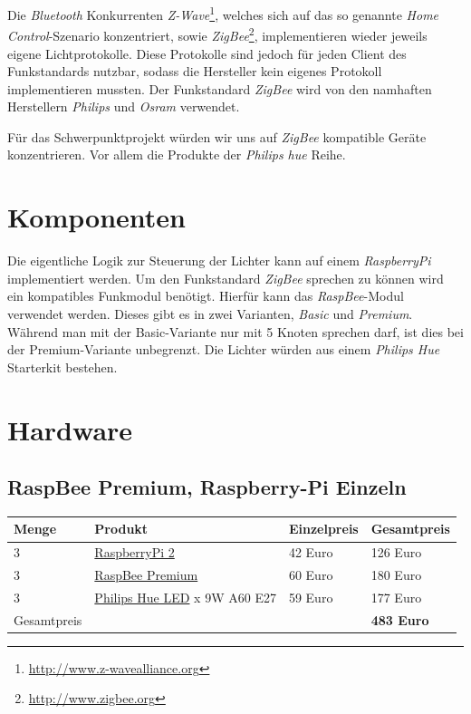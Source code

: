 \documentclass[a4paper,12pt]{article}
\begin{document}
Die \textit{Bluetooth} Konkurrenten
\textit{Z-Wave}\footnote{\url{http://www.z-wavealliance.org}}, welches sich auf das
so genannte \textit{Home Control}-Szenario konzentriert, sowie
\textit{ZigBee}\footnote{\url{http://www.zigbee.org}},
implementieren wieder jeweils eigene Lichtprotokolle. Diese Protokolle sind jedoch
für jeden Client des Funkstandards nutzbar, sodass die Hersteller kein
eigenes Protokoll implementieren mussten. Der Funkstandard \textit{ZigBee} wird
von den namhaften Herstellern \textit{Philips} und \textit{Osram} verwendet.

Für das Schwerpunktprojekt würden wir uns auf \textit{ZigBee} kompatible Geräte
konzentrieren. Vor allem die Produkte der \textit{Philips hue} Reihe.

\section{Komponenten}
\label{components}

Die eigentliche Logik zur Steuerung der Lichter kann auf einem \textit{RaspberryPi}
implementiert werden. Um den Funkstandard \textit{ZigBee} sprechen zu können wird ein
kompatibles Funkmodul benötigt. Hierfür kann das \textit{RaspBee}-Modul verwendet werden.
Dieses gibt es in zwei Varianten, \textit{Basic} und \textit{Premium}. Während man mit der
Basic-Variante nur mit 5 Knoten sprechen darf, ist dies bei der Premium-Variante
unbegrenzt. Die Lichter würden aus einem \textit{Philips Hue} Starterkit bestehen.

\section{Hardware}
\label{hardware}

\subsection{RaspBee Premium, Raspberry-Pi Einzeln}

\begin{tabular}{p{2cm}p{4.5cm}p{3cm}p{3cm}}
   Menge & Produkt & Einzelpreis & Gesamtpreis\\
   \hline
   3 & \href{http://www.conrad.de/ce/de/product/1316978/Raspberry-Pi-2-Model-B-1-GB-ohne-Betriebssystem}{RaspberryPi 2} & 42 Euro & 126 Euro\\
   3 & \href{http://www.conrad.de/ce/de/product/1369407/Raspberry-Pi-Erweiterungs-Platine-Zigbee-200-Knotenpunkte-Raspberry-Pi}{RaspBee Premium} & 60 Euro & 180 Euro\\
   3 & \href{http://www.conrad.de/ce/de/product/1314141/Philips-Hue-LED-Leuchtmittel-Erweiterung-E27-9-W-RGB}{Philips Hue LED}
        \newline 1 x 9W A60 E27 & 59 Euro & 177 Euro\\
   \hline
   Gesamtpreis & & & \textbf{483 Euro}\\
\end{tabular}
\end{document}
